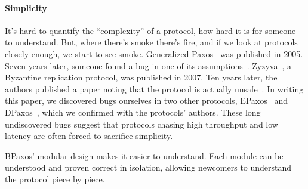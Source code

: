 \paragraph{Simplicity}
It's hard to quantify the ``complexity'' of a protocol, how hard it is for
someone to understand. But, where there's smoke there's fire, and if we look at
protocols closely enough, we start to see smoke. Generalized
Paxos~\cite{lamport2005generalized} was published in 2005. Seven years later,
someone found a bug in one of its assumptions~\cite{sutra2011fast}.
Zyzyva~\cite{kotla2007zyzzyva}, a Byzantine replication protocol, was published
in 2007. Ten years later, the authors published a paper noting that the
protocol is actually unsafe~\cite{abraham2017revisiting}. In writing this
paper, we discovered bugs ourselves in two other protocols,
EPaxos~\cite{moraru2013there} and DPaxos~\cite{nawab2018dpaxos}, which we
confirmed with the protocols' authors. These long undiscovered bugs suggest
that protocols chasing high throughput and low latency are often forced to
sacrifice simplicity.

BPaxos' modular design makes it easier to understand. Each module can be
understood and proven correct in isolation, allowing newcomers to understand
the protocol piece by piece.

%
%
%

